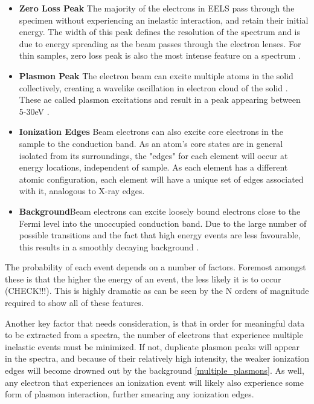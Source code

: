 \begin{itemize}
	\item \textbf{Zero Loss Peak} The majority of the electrons in EELS pass through the specimen without experiencing an inelastic interaction, and retain their initial energy.  The width of this peak defines the resolution of the spectrum and is due to energy spreading as the beam passes through the electron lenses.  For thin samples, zero loss peak is also the most intense feature on a spectrum \cite{Egerton}.  
	
	\item \textbf{Plasmon Peak}  The electron beam can excite multiple atoms in the solid collectively, creating a wavelike oscillation in electron cloud of the solid \cite{Egerton}.  These ae called plasmon excitations and result in a peak appearing between 5-30eV \cite{Egerton}.  
	
	\item \textbf{Ionization Edges} Beam electrons can also excite core electrons in the sample to the conduction band.  As an atom's core states are in general isolated from its surroundings, the "edges" for each element will occur at energy locations, independent of sample.  As each element has a different atomic configuration, each element will have a unique set of edges associated with it, analogous to X-ray edges.  
	
	\item  \textbf{Background}Beam electrons can excite loosely bound electrons close to the Fermi level into the unoccupied conduction band.  Due to the large number of possible transitions and the fact that high energy events are less favourable, this results in a smoothly decaying background \cite{Egerton}.
	
	
\end{itemize}

The probability of each event depends on a number of factors.   Foremost amongst these is that the higher the energy of an event, the less likely it is to occur (CHECK!!!). This is highly dramatic as can be seen by the N orders of magnitude required to show all of these features.  

Another key factor that needs consideration, is that in order for meaningful data to be extracted from a spectra, the number of electrons that experience multiple inelastic events must be minimized.  If not, duplicate plasmon peaks will appear in the spectra, and because of their relatively high intensity, the weaker ionization edges will become drowned out by the background \ref{multiple_plasmons}. As well, any electron that experiences an ionization event will likely also experience some form of plasmon interaction, further smearing any ionization edges.  

